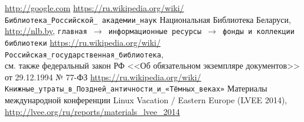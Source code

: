 \documentclass[10pt, a5paper]{article}
\begin{document}
\begin{thebibliography}{9}
 \url{http://google.com}
 \url{https://ru.wikipedia.org/wiki/}\\ \texttt{Библиотека\_Российской\_ академии\_наук}
 Национальная Библиотека Беларуси, \url{http://nlb.by}, \texttt{главная $\to$ информационные ресурсы $\to$ фонды и коллекции библиотеки}
 \url{https://ru.wikipedia.org/wiki/}\\ \texttt{Российская\_государственная\_библиотека},\\ 
см. также федеральный закон РФ <<Об обязательном экземпляре документов>> от 29.12.1994 № 77-ФЗ
 \url{https://ru.wikipedia.org/wiki/}\\ \texttt{Книжные\_утраты\_в\_Поздней\_античности\_и\_«Тёмных\_веках»}
 Материалы международной конференции Linux Vacation / Eastern
Europe (LVEE 2014), \url{http://lvee.org/ru/reports/materials_lvee_2014}
\end{thebibliography}
\end{document}
